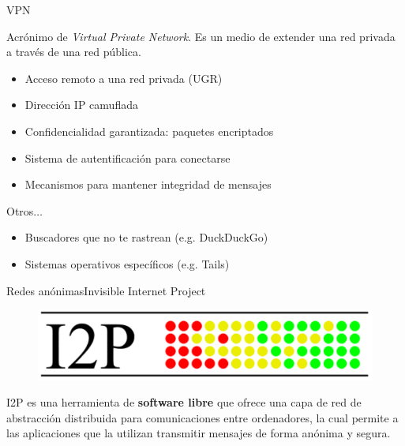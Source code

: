 \documentclass[spanish]{beamer}
\begin{document}
\begin{frame}{VPN}

Acrónimo de \textit{Virtual Private Network}. Es un medio de extender una red privada a través de una red pública.

\vspace{1.9em}

\begin{itemize}
	\item Acceso remoto a una red privada (UGR) \\
	\item Dirección IP camuflada \\ 
	\item Confidencialidad garantizada: paquetes encriptados \\
	\item Sistema de autentificación para conectarse
	\item Mecanismos para mantener integridad de mensajes
\end{itemize}	

\end{frame}



\begin{frame}{Otros$\dots$}

\begin{itemize}
	\item Buscadores que no te rastrean (e.g. DuckDuckGo)
	\item Sistemas operativos específicos (e.g. Tails)
\end{itemize}

\end{frame}



\begin{frame}{Redes anónimas}{Invisible Internet Project}
	\vspace{-1em}
	
	\begin{figure}
	\centering
	\includegraphics[width=.5\textwidth]{img/i2p_logo}
\end{figure}
I2P es una herramienta de \textbf{software libre} que ofrece una capa de red de abstracción distribuida para comunicaciones entre ordenadores, la cual permite a las aplicaciones que la utilizan transmitir mensajes de forma anónima y segura.
	
\end{frame}
\end{document}
